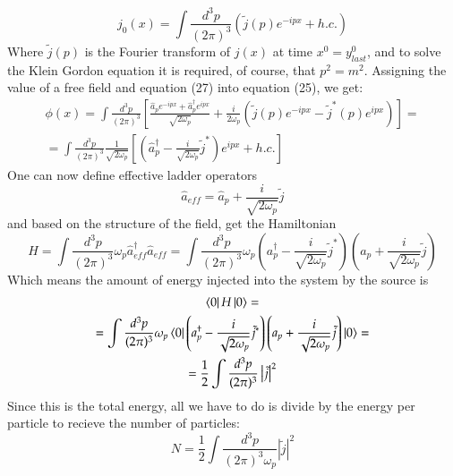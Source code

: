 \documentclass{article}
\begin{document}
\begin{equation}
    j_0(x) = \int \frac{d^3p}{(2\pi)^3} \left(\tilde{j}(p) e^{-ipx} + h.c.\right)
\end{equation}
Where $\tilde{j}(p)$ is the Fourier transform of $j(x)$ at time $x^0 = y^0_{last}$, and to solve the Klein Gordon equation it is required, of course, that $p^2 = m^2$.
\newline
Assigning the value of a free field and equation (27) into equation (25), we get:
\begin{equation}
\begin{gathered}
    \phi(x) = \int \frac{d^3p}{(2\pi)^3}\left[
        \frac{\hat{a}_p e^{-ipx} + \hat{a}_p^\dagger e^{ipx}}{\sqrt{2\omega_p}} + 
        \frac{i}{2\omega_p}\left(\tilde{j}(p) e^{-ipx} - \tilde{j}^*(p) e^{ipx}\right)
    \right] =
    \\ 
    = \int \frac{d^3p}{(2\pi)^3}\frac{1}{\sqrt{2\omega_p}}\left[
        \left(
            \hat{a}^\dagger_p - \frac{i}{\sqrt{2\omega_p}}\tilde{j}^*
        \right) e^{ipx} + h.c.
    \right]
\end{gathered}
\end{equation}
One can now define effective ladder operators
\begin{equation}
    \hat{a}_{eff} = \hat{a}_p + \frac{i}{\sqrt{2\omega_p}}\tilde{j}
\end{equation}
and based on the structure of the field, get the Hamiltonian
\begin{equation}
    H =
    \int \frac{d^3p}{(2\pi)^3}\omega_p
        \hat{a}_{eff}^\dagger \hat{a}_{eff}
    =
    \int \frac{d^3p}{(2\pi)^3}\omega_p
        \left(a_p^\dagger - \frac{i}{\sqrt{2\omega_p}}\tilde{j}^*\right)
        \left(a_p + \frac{i}{\sqrt{2\omega_p}}\tilde{j}\right)
\end{equation}
Which means the amount of energy injected into the system by the source is
\begin{equation}
\begin{gathered}
    \bra{0}H\ket{0} =
    \\
    = \int \frac{d^3p}{(2\pi)^3}\omega_p\bra{0}
        \left(a_p^\dagger - \frac{i}{\sqrt{2\omega_p}}\tilde{j}^*\right)
        \left(a_p + \frac{i}{\sqrt{2\omega_p}}\tilde{j}\right)
    \ket{0} = 
    \\
    = \frac{1}{2}\int \frac{d^3p}{(2\pi)^3}
        \left|\tilde{j}\right|^2
\end{gathered}
\end{equation}
Since this is the total energy, all we have to do is divide by the energy per particle to recieve the number of particles:
\begin{equation}
    N = \frac{1}{2}\int \frac{d^3p}{(2\pi)^3 \omega_p}
        \left|\tilde{j}\right|^2
\end{equation}
\end{document}
